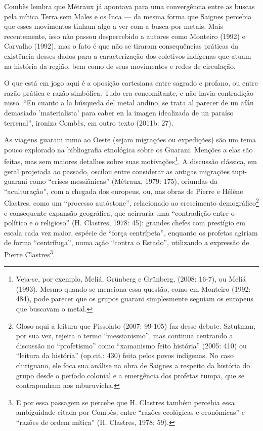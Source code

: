 Combès lembra que Métraux já apontava para uma convergência entre as
buscas pela mítica Terra sem Males e os Inca --- da mesma forma que
Saignes percebia que esses movimentos tinham algo a ver com a busca por
metais. Mais recentemente, isso não passou despercebido a autores como
Monteiro (1992) e Carvalho (1992), mas o fato é que não se tiraram
consequências práticas da existência desses dados para a caracterização
dos coletivos indígenas que atuam na história da região, bem como de
seus movimentos e redes de circulação.

O que está em jogo aqui é a oposição cartesiana entre sagrado e profano,
ou entre razão prática e razão simbólica. Tudo era concomitante, e não
havia contradição nisso. ``En cuanto a la búsqueda del metal andino, se
trata al parecer de un afán demasiado
'materialista' para caber en la
imagen idealizada de un paraíso terrenal'', ironiza Combès, em outro
texto (2011b: 27).

As viagens guarani rumo ao Oeste (sejam migrações ou expedições) são um
tema pouco explorado na bibliografia etnológica sobre os Guarani.
Menções a elas são feitas, mas sem maiores detalhes sobre suas
motivações\footnote{Veja-se, por exemplo, Meliá, Grünberg e Grünberg,
(2008: 16-7), ou Meliá (1993). Mesmo quando se menciona essa questão,
como em Monteiro (1992: 484), pode parecer que os grupos guarani
simplesmente seguiam os europeus que buscavam o metal. }. A discussão
clássica, em geral projetada ao passado, oscilou entre considerar as
antigas migrações tupi-guarani como ``crises messiânicas'' (Métraux,
1979: 175), oriundas da ``aculturação'', com a chegada dos europeus, ou,
nas obras de Pierre e Hélène Clastres, como um ``processo autóctone'',
relacionado ao crescimento demográfico\footnote{Gloso aqui a leitura
que Pissolato (2007: 99-105) faz desse debate. Sztutman, por sua vez,
rejeita o termo ``messianismo'', mas continua centrando a discussão no
``profetismo'' como ``xamanismo feito história'' (2005: 410) ou ``leitura da
história'' (op.cit.: 430) feita pelos povos indígenas. No caso
chiriguano, ele foca sua análise na obra de Saignes a respeito da
história do grupo desde o período colonial e a emergência dos profetas
tumpa, que se contrapunham aos mburuvicha.} e consequente expansão
geográfica, que acirraria uma ``contradição entre o político e o
religioso'' (H. Clastres, 1978: 45): grandes chefes com prestígio em
escala cada vez maior, espécie de ``força centrípeta'', enquanto os
profetas agiriam de forma ``centrífuga'', numa ação ``contra o Estado'',
utilizando a expressão de Pierre Clastres\footnote{E por essa passagem
se percebe que H. Clastres também percebia essa ambiguidade citada por
Combès, entre ``razões ecológicas e econômicas'' e ``razões de ordem
mítica'' (H. Clastres, 1978: 59).}.

